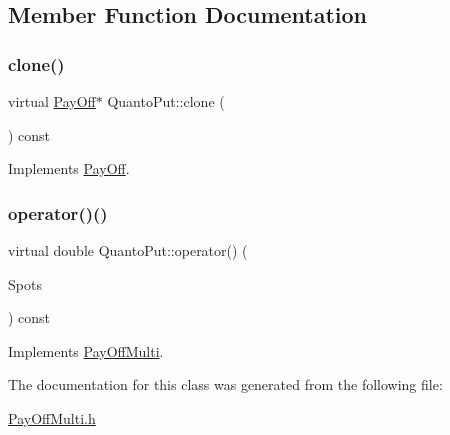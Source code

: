 \subsection{Member Function Documentation}
\hypertarget{classQuantoPut_af6ffdcc7c2ebb6f38f306192aa471960}{}\label{classQuantoPut_af6ffdcc7c2ebb6f38f306192aa471960} 
\subsubsection{\texorpdfstring{clone()}{clone()}}
{\footnotesize\ttfamily virtual \hyperlink{classPayOff}{Pay\+Off}$\ast$ Quanto\+Put\+::clone (\begin{DoxyParamCaption}{ }\end{DoxyParamCaption}) const\hspace{0.3cm}{\ttfamily [virtual]}}



Implements \hyperlink{classPayOff_ad8194d5b82247ae89c25c515f0ba806a}{Pay\+Off}.

\hypertarget{classQuantoPut_a76cf359e7b7c31dc39b8f2c20d145b92}{}\label{classQuantoPut_a76cf359e7b7c31dc39b8f2c20d145b92} 
\subsubsection{\texorpdfstring{operator()()}{operator()()}}
{\footnotesize\ttfamily virtual double Quanto\+Put\+::operator() (\begin{DoxyParamCaption}\item[{const \hyperlink{classMJArray}{M\+J\+Array} \&}]{Spots }\end{DoxyParamCaption}) const\hspace{0.3cm}{\ttfamily [virtual]}}



Implements \hyperlink{classPayOffMulti_a61039e0c0ee136842b5d6f340b9f8155}{Pay\+Off\+Multi}.



The documentation for this class was generated from the following file\+:\begin{DoxyCompactItemize}
\item 
\hyperlink{PayOffMulti_8h}{Pay\+Off\+Multi.\+h}\end{DoxyCompactItemize}
